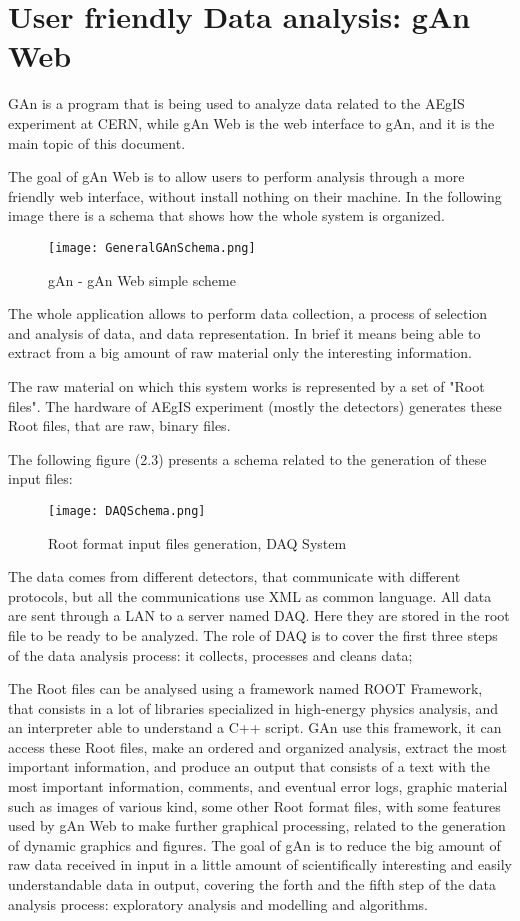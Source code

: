 \section{User friendly Data analysis: gAn Web}

GAn is a program that is being used to analyze data related to the AEgIS experiment at CERN, while gAn Web is the web interface to gAn, and it is the main topic of this document.

The goal of gAn Web is to allow users to perform analysis through a more friendly web interface, without install nothing on their machine. In the following image there is a schema that shows how the whole system is organized.

\begin{figure}[H]
\centering
\texttt{[image: GeneralGAnSchema.png]} 
\caption{gAn - gAn Web simple scheme}
\end{figure}

The whole application allows to perform data collection, a process of selection and analysis of data, and data representation. In brief it means being able to extract from a big amount of raw material only the interesting information.

The raw material on which this system works is represented by a set of "Root files". 
The hardware of AEgIS experiment (mostly the detectors) generates these Root files, that are raw, binary files. 
 
The following figure (2.3) presents a schema related to the generation of these input files:

\begin{figure}[H]
\centering
\texttt{[image: DAQSchema.png]} 
\caption{Root format input files generation, DAQ System}
\end{figure}

The data comes from different detectors, that communicate with different protocols, but all the communications use XML as common language. All data are sent through a LAN to a server named DAQ. Here they are stored in the root file to be ready to be analyzed.
The role of DAQ is to cover the first three steps of the data analysis process: it collects, processes and cleans data;

The Root files can be analysed using a framework named ROOT Framework, that consists in a lot of libraries specialized in high-energy physics analysis, and an interpreter able to understand a C++ script.
GAn use this framework, it can access these Root files, make an ordered and organized analysis, extract the most important information, and produce an output that consists of a text with the most important information, comments, and eventual error logs, graphic material such as images of various kind, some other Root format files, with some features used by gAn Web to make further graphical processing, related to the generation of dynamic graphics and figures. 
The goal of gAn is to reduce the big amount of raw data received in input in a little amount of scientifically interesting and easily understandable data in output, covering the forth and the fifth step of the data analysis process: exploratory analysis and modelling and algorithms.

